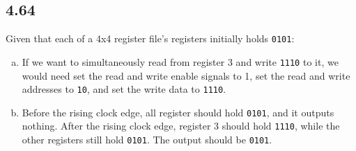\documentclass{article}
\begin{document}
\subsection*{4.64}
Given that each of a 4x4 register file's registers initially holds \texttt{0101}:
\begin{enumerate}[(a)]
    \item If we want to simultaneously read from register 3 and write \texttt{1110} to it, we would need set the read and write enable signals to 1, set the read and write addresses to \texttt{10}, and set the write data to \texttt{1110}.
    \item Before the rising clock edge, all register should hold \texttt{0101}, and it outputs nothing. After the rising clock edge, register 3 should hold \texttt{1110}, while the other registers still hold \texttt{0101}. The output should be \texttt{0101}.
\end{enumerate}
\end{document}
